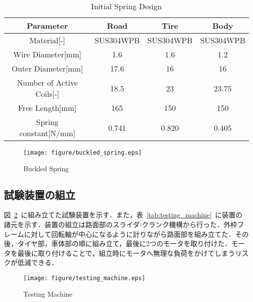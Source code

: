 \documentclass[a4paper,12pt]{article_vdlab_sotsuron}
\begin{document}
\vspace*{10mm}
\begin{table}[htp]
    \begin{center}
      \makeatletter
      \def\@captype{table}   
      \makeatother
      \caption{Initial Spring Design}
	\label{tab:buckled_spring}
	  \begin{tabular}{cccc}\hline
	    Parameter & Road & Tire & Body \\\hline
	    Material[-] & SUS304WPB & SUS304WPB & SUS304WPB \\
	    Wire Diameter[mm] & 1.6 & 1.6 & 1.2 \\
	    Outer Diameter[mm] & 17.6 & 16 & 16 \\
	    Number of Active Coils[-] & 18.5 & 23 & 23.75 \\
	    Free Length[mm] & 165 & 150 & 150 \\
	    Spring constant[N/mm] & 0.741 & 0.820 & 0.405 \\\hline
	\end{tabular}
      \end{center}
\end{table}

\vspace*{10mm}
\begin{figure}[htp]
  \begin{center}
    \texttt{[image: figure/buckled\_spring.eps]}
    \vspace*{3mm}
    \caption{Buckled Spring}
    \label{fig:buckled_spring}
  \end{center}
\end{figure}

\newpage
\subsection{試験装置の組立}
図~\ref{fig:testing_machine}~に組み立てた試験装置を示す．また，表~\ref{tab:testing_machine}~に装置の諸元を示す．装置の組立は路面部のスライダ-クランク機構から行った．外枠フレームに対して回転軸が中心になるように計りながら路面部を組み立てた．その後，タイヤ部，車体部の順に組み立て，最後に2つのモータを取り付けた．モータを最後に取り付けることで，組立時にモータへ無理な負荷をかけてしまうリスクが低減できる．

\vspace*{10mm}
\begin{figure}[htp]
  \begin{center}
    \texttt{[image: figure/testing\_machine.eps]}
    \vspace*{3mm}
    \caption{Testing Machine}
    \label{fig:testing_machine}
  \end{center}
\end{figure}
\end{document}
